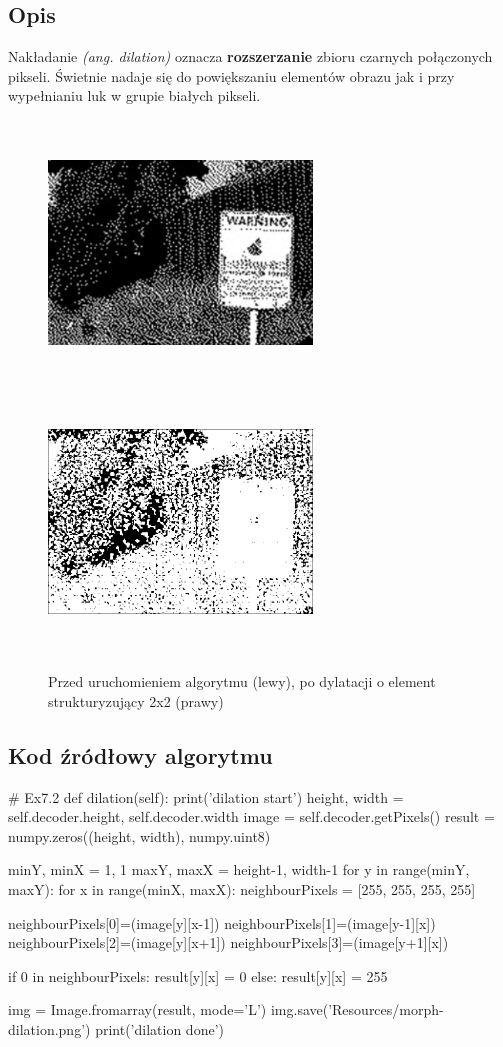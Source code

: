 \documentclass[a4paper,12pt]{book}
\begin{document}
\subsection{Opis}
Nakładanie \textit{(ang. dilation)} oznacza \textbf{rozszerzanie} zbioru czarnych połączonych pikseli. Świetnie nadaje się do powiększaniu elementów obrazu jak i przy wypełnianiu luk w grupie białych pikseli. 
\begin{figure}[H]
	\caption{Przed uruchomieniem algorytmu (lewy), po dylatacji o element strukturyzujący 2x2 (prawy)}
	\includegraphics[width=7cm, height=7cm]{binary-unmodified.png}
	\includegraphics[width=7cm, height=7cm]{binary-dilation.png}
\end{figure}
\subsection{Kod źródłowy algorytmu}
\begin{python}
# Ex7.2
def dilation(self):
	print('dilation start')
	height, width = self.decoder.height, self.decoder.width
	image = self.decoder.getPixels()
	result = numpy.zeros((height, width), numpy.uint8)
	
	minY, minX = 1, 1
	maxY, maxX = height-1, width-1
	for y in range(minY, maxY):
		for x in range(minX, maxX):
			neighbourPixels = [255, 255, 255, 255]
	
			neighbourPixels[0]=(image[y][x-1])
			neighbourPixels[1]=(image[y-1][x])
			neighbourPixels[2]=(image[y][x+1])
			neighbourPixels[3]=(image[y+1][x])
			
			if 0 in neighbourPixels:
				result[y][x] = 0
			else:
				result[y][x] = 255
	
	img = Image.fromarray(result, mode='L')
	img.save('Resources/morph-dilation.png')
	print('dilation done')
\end{python}
\end{document}

